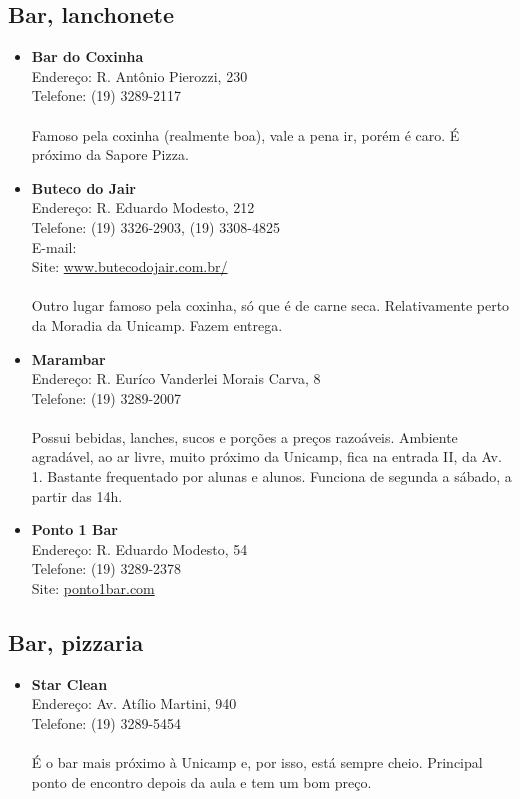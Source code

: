 \subsection{Bar, lanchonete}

\begin{itemize}
\item \textbf{Bar do Coxinha}
  \\Endereço: R. Antônio Pierozzi, 230
  \\Telefone: (19) 3289-2117
  \\
  \\Famoso pela coxinha (realmente boa), vale a pena ir, porém é caro. É
  próximo da Sapore Pizza.

\item \textbf{Buteco do Jair}
  \\Endereço: R. Eduardo Modesto, 212
  \\Telefone: (19) 3326-2903, (19) 3308-4825
  \\E-mail: 
  \\Site: \url{www.butecodojair.com.br/}
  \\
  \\Outro lugar famoso pela coxinha, só que é de carne seca. Relativamente
  perto da Moradia da Unicamp. Fazem entrega.

\item \textbf{Marambar}
  \\Endereço: R. Euríco Vanderlei Morais Carva, 8
  \\Telefone: (19) 3289-2007
  \\
  \\Possui bebidas, lanches, sucos e porções a preços razoáveis. Ambiente
  agradável, ao ar livre, muito próximo da Unicamp, fica na entrada II, da Av.
  1. Bastante frequentado por alunas e alunos. Funciona de segunda a sábado, a
  partir das 14h.

\item \textbf{Ponto 1 Bar}
  \\Endereço: R. Eduardo Modesto, 54
  \\Telefone: (19) 3289-2378
  \\Site: \url{ponto1bar.com}
\end{itemize}

\subsection{Bar, pizzaria}

\begin{itemize}
\item \textbf{Star Clean}
  \\Endereço: Av. Atílio Martini, 940
  \\Telefone: (19) 3289-5454
  \\
  \\É o bar mais próximo à Unicamp e, por isso, está sempre cheio. Principal
  ponto de encontro depois da aula e tem um bom preço.
\end{itemize}

